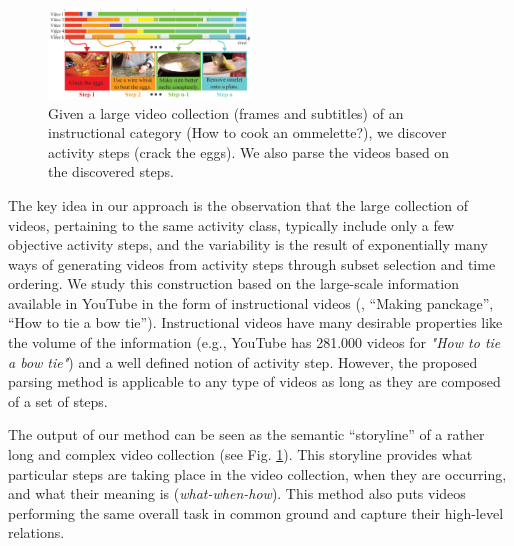 
\begin{figure}[h!]
  \includegraphics[width=0.48\textwidth]{Figure_1_flattened}
  \caption{Given a large video collection (frames and subtitles) of an instructional category (\eg How to cook an ommelette?), we discover activity steps (\eg crack the eggs). We also parse the videos based on the discovered steps.}
  \label{teaser}
  \vspace{-5mm}
\end{figure}


The key idea in our approach is the observation that the large collection of videos, pertaining to the same activity class, typically include only a few objective activity steps, and the variability is the result of exponentially many ways of generating videos from activity steps through subset selection and time ordering. We study this construction based on the large-scale information available in YouTube in the form of instructional videos  (\eg, ``Making panckage'', ``How to tie a bow tie''). Instructional videos have many desirable properties like the volume of the information (e.g., YouTube has 281.000 videos for \emph{"How to tie a bow tie"}) and a well defined notion of activity step.  However, the proposed parsing method is applicable to any type of videos as long as they are composed of a set of steps.

The output of our method can be seen as the semantic ``storyline'' of a rather long and complex video collection (see Fig. \ref{teaser}). This storyline provides what particular steps are taking place in the video collection, when they are occurring, and what their meaning is (\emph{what-when-how}). This method also puts videos performing the same overall task in common ground and capture their high-level relations.

